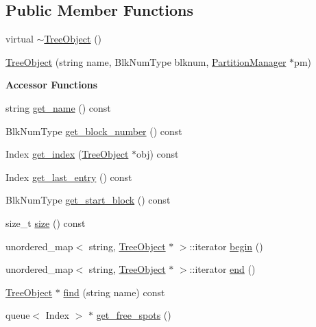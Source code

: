\subsection*{Public Member Functions}
\begin{DoxyCompactItemize}
\item 
virtual \mbox{\hyperlink{class_tree_object_a0be0e98771c0ccbeee1930c340d372a9}{$\sim$\+Tree\+Object}} ()
\item 
\mbox{\hyperlink{class_tree_object_a1ef90156e6b45ddef28c59a89cd1097d}{Tree\+Object}} (string name, Blk\+Num\+Type blknum, \mbox{\hyperlink{class_partition_manager}{Partition\+Manager}} $\ast$pm)
\end{DoxyCompactItemize}
\begin{Indent}\textbf{ Accessor Functions}\par
\begin{DoxyCompactItemize}
\item 
string \mbox{\hyperlink{class_tree_object_a5216922ec0b98bcc375601db8d253770}{get\+\_\+name}} () const
\item 
Blk\+Num\+Type \mbox{\hyperlink{class_tree_object_af7841065fe85d0884341d72669185169}{get\+\_\+block\+\_\+number}} () const
\item 
Index \mbox{\hyperlink{class_tree_object_ae0983a3ff99d413e22beaaac8d7b6d12}{get\+\_\+index}} (\mbox{\hyperlink{class_tree_object}{Tree\+Object}} $\ast$obj) const
\item 
Index \mbox{\hyperlink{class_tree_object_a2d7c1a4c2d36c81110ccae09d9724125}{get\+\_\+last\+\_\+entry}} () const
\item 
Blk\+Num\+Type \mbox{\hyperlink{class_tree_object_a16153734dbee4adc99fa195715728c2f}{get\+\_\+start\+\_\+block}} () const
\item 
size\+\_\+t \mbox{\hyperlink{class_tree_object_a2a3dffe29aba8965c7977312c3721b50}{size}} () const
\item 
unordered\+\_\+map$<$ string, \mbox{\hyperlink{class_tree_object}{Tree\+Object}} $\ast$ $>$\+::iterator \mbox{\hyperlink{class_tree_object_af8bb5e54c0a13e1e0e5be409153ab6d8}{begin}} ()
\item 
unordered\+\_\+map$<$ string, \mbox{\hyperlink{class_tree_object}{Tree\+Object}} $\ast$ $>$\+::iterator \mbox{\hyperlink{class_tree_object_a2544e2976f3b75cd1f0230f5f908059c}{end}} ()
\item 
\mbox{\hyperlink{class_tree_object}{Tree\+Object}} $\ast$ \mbox{\hyperlink{class_tree_object_a6a7477c29a06a9896df549f83611252f}{find}} (string name) const
\item 
queue$<$ Index $>$ $\ast$ \mbox{\hyperlink{class_tree_object_aa0900ad50c10023e4700f11218d30d7a}{get\+\_\+free\+\_\+spots}} ()
\end{DoxyCompactItemize}
\end{Indent}
